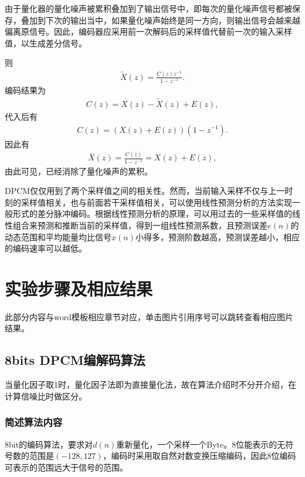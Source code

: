 \documentclass{hitreport}
\begin{document}
由于量化器的量化噪声被累积叠加到了输出信号中，即每次的量化噪声信号都被保存，叠加到下次的输出当中，如果量化噪声始终是同一方向，则输出信号会越来越偏离原信号。因此，编码器应采用前一次解码后的采样值代替前一次的输入采样值，以生成差分信号。

则
\begin{align}
\widetilde{X}\left(z\right) = \frac{C\left(z\right)z^{-1}}{1-z^{-1}}.
\end{align}
编码结果为
\begin{align}
C\left(z\right) = X\left(z\right) - \widetilde{X}\left(z\right)+E\left(z\right),
\end{align}
代入后有
\begin{align}
C\left(z\right) = \left(X\left(z\right)+E\left(z\right)\right)\left(1-z^{-1}\right).
\end{align}
因此有
\begin{align}
\bar{X}\left(z\right) = \frac{C\left(z\right)}{1-z^{-1}} = X\left(z\right) + E\left(z\right),
\end{align}
由此可见，已经消除了量化噪声的累积。

DPCM仅仅用到了两个采样值之间的相关性。然而，当前输入采样不仅与上一时刻的采样值相关，也与前面若干采样值相关，可以使用线性预测分析的方法实现一般形式的差分脉冲编码。根据线性预测分析的原理，可以用过去的一些采样值的线性组合来预测和推断当前的采样值，得到一组线性预测系数，且预测误差$e\left(n\right)$的动态范围和平均能量均比信号$x\left(n\right)$小得多，预测阶数越高，预测误差越小，相应的编码速率可以越低。


\section{实验步骤及相应结果}

此部分内容与word模板相应章节对应，单击图片引用序号可以跳转查看相应图片结果。

\subsection{ 8bits DPCM编解码算法}

当量化因子取1时，量化因子法即为直接量化法，故在算法介绍时不分开介绍，在计算信噪比时做区分。

\subsubsection{简述算法内容}\label{sec:the}

8bit的编码算法，要求对$d\left(n\right)$重新量化，一个采样一个Byte。8位能表示的无符号数的范围是$\left(-128, 127\right)$，编码时采用取自然对数变换压缩编码，因此8位编码可表示的范围远大于信号的范围。
\end{document}
